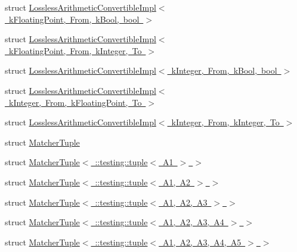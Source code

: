 \begin{DoxyCompactItemize}
\item 
struct \mbox{\hyperlink{structtesting_1_1internal_1_1LosslessArithmeticConvertibleImpl_3_01kFloatingPoint_00_01From_00_01kBool_00_01bool_01_4}{Lossless\+Arithmetic\+Convertible\+Impl$<$ k\+Floating\+Point, From, k\+Bool, bool $>$}}
\item 
struct \mbox{\hyperlink{structtesting_1_1internal_1_1LosslessArithmeticConvertibleImpl_3_01kFloatingPoint_00_01From_00_01kInteger_00_01To_01_4}{Lossless\+Arithmetic\+Convertible\+Impl$<$ k\+Floating\+Point, From, k\+Integer, To $>$}}
\item 
struct \mbox{\hyperlink{structtesting_1_1internal_1_1LosslessArithmeticConvertibleImpl_3_01kInteger_00_01From_00_01kBool_00_01bool_01_4}{Lossless\+Arithmetic\+Convertible\+Impl$<$ k\+Integer, From, k\+Bool, bool $>$}}
\item 
struct \mbox{\hyperlink{structtesting_1_1internal_1_1LosslessArithmeticConvertibleImpl_3_01kInteger_00_01From_00_01kFloatingPoint_00_01To_01_4}{Lossless\+Arithmetic\+Convertible\+Impl$<$ k\+Integer, From, k\+Floating\+Point, To $>$}}
\item 
struct \mbox{\hyperlink{structtesting_1_1internal_1_1LosslessArithmeticConvertibleImpl_3_01kInteger_00_01From_00_01kInteger_00_01To_01_4}{Lossless\+Arithmetic\+Convertible\+Impl$<$ k\+Integer, From, k\+Integer, To $>$}}
\item 
struct \mbox{\hyperlink{structtesting_1_1internal_1_1MatcherTuple}{Matcher\+Tuple}}
\item 
struct \mbox{\hyperlink{structtesting_1_1internal_1_1MatcherTuple_3_01_1_1testing_1_1tuple_3_01A1_01_4_01_4}{Matcher\+Tuple$<$ \+::testing\+::tuple$<$ A1 $>$ $>$}}
\item 
struct \mbox{\hyperlink{structtesting_1_1internal_1_1MatcherTuple_3_01_1_1testing_1_1tuple_3_01A1_00_01A2_01_4_01_4}{Matcher\+Tuple$<$ \+::testing\+::tuple$<$ A1, A2 $>$ $>$}}
\item 
struct \mbox{\hyperlink{structtesting_1_1internal_1_1MatcherTuple_3_01_1_1testing_1_1tuple_3_01A1_00_01A2_00_01A3_01_4_01_4}{Matcher\+Tuple$<$ \+::testing\+::tuple$<$ A1, A2, A3 $>$ $>$}}
\item 
struct \mbox{\hyperlink{structtesting_1_1internal_1_1MatcherTuple_3_01_1_1testing_1_1tuple_3_01A1_00_01A2_00_01A3_00_01A4_01_4_01_4}{Matcher\+Tuple$<$ \+::testing\+::tuple$<$ A1, A2, A3, A4 $>$ $>$}}
\item 
struct \mbox{\hyperlink{structtesting_1_1internal_1_1MatcherTuple_3_01_1_1testing_1_1tuple_3_01A1_00_01A2_00_01A3_00_01A4_00_01A5_01_4_01_4}{Matcher\+Tuple$<$ \+::testing\+::tuple$<$ A1, A2, A3, A4, A5 $>$ $>$}}

\end{DoxyCompactItemize}
